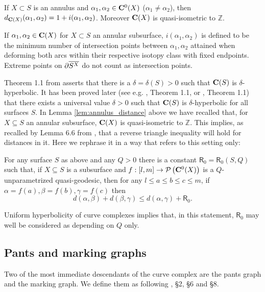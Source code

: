\begin{lemma}\label{lem:annulus_distance}
If $X\subset S$ is an annulus and $\alpha_1,\alpha_2\in\mathbf C^0(X)$ ($\alpha_1\not=\alpha_2$), then $d_{\mathbf C(X)}(\alpha_1,\alpha_2)=1+i(\alpha_1,\alpha_2)$. Moreover $\mathbf C(X)$ is quasi-isometric to $\mathbb Z$.
\end{lemma}
If $\alpha_1,\alpha_2\in \mathbf C(X)$ for $X\subset S$ an annular subsurface, $i(\alpha_1,\alpha_2)$ is defined to be the minimum number of intersection points between $\alpha_1,\alpha_2$ attained when deforming both arcs within their respective isotopy class with fixed endpoints. Extreme points on $\partial\overline{S^X}$ do not count as intersection points.

Theorem 1.1 from \cite{masurminskyi} asserts that there is a $\delta=\delta(S)>0$ such that $\mathbf C(S)$ is $\delta$-hyperbolic. It has been proved later (see e.g. \cite{bowditch2014uniform}, Theorem 1.1, or \cite{hensel20151}, Theorem 1.1) that there exists a universal value $\delta>0$ such that $\mathbf C(S)$ is $\delta$-hyperbolic for all surfaces $S$. In Lemma \ref{lem:annulus_distance} above we have recalled that, for $X\subseteq S$ an annular subsurface, $\mathbf C(X)$ is quasi-isometric to $\mathbb Z$. This implies, as recalled by Lemma 6.6 from \cite{mms}, that a reverse triangle inequality will hold for distances in it. Here we rephrase it in a way that refers to this setting only:
\begin{lemma}\label{lem:reversetriangle}
For any surface $S$ as above and any $Q>0$ there is a constant $\mathsf{R}_0=\mathsf{R}_0(S,Q)$ such that, if $X\subseteq S$ is a subsurface and $f:[l,m]\rightarrow \mathcal P\left(\mathbf C^0(X)\right)$ is a $Q$-unparametrized quasi-geodesic, then for any $l\leq a\leq b\leq c\leq m$, if $\alpha=f(a),\beta=f(b),\gamma=f(c)$ then
$$
d(\alpha,\beta)+d(\beta,\gamma)\leq d(\alpha,\gamma)+\mathsf{R}_0.
$$
\end{lemma}
Uniform hyperbolicity of curve complexes implies that, in this statement, $\mathsf{R}_0$ may well be considered as depending on $Q$ only.

\subsection{Pants and marking graphs}

Two of the most immediate descendants of the curve complex are the pants graph and the marking graph. We define them as following \cite{masurminskyii}, \S 2, \S 6 and \S 8.

